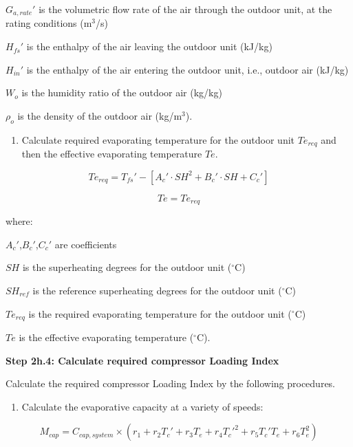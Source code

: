 \({G_{a,rate}}'\) is the volumetric flow rate of the air through the outdoor unit, at the rating conditions (m\(^{3}\)/s)

\({H_{fs}}'\) is the enthalpy of the air leaving the outdoor unit (kJ/kg)

\({H_{in}}'\) is the enthalpy of the air entering the outdoor unit, i.e., outdoor air (kJ/kg)

\(W_o\) is the humidity ratio of the outdoor air (kg/kg)

\(\rho_o\) is the density of the outdoor air (kg/m\(^{3}\)).

\begin{enumerate}
\def\labelenumi{(\arabic{enumi})}
\setcounter{enumi}{1}
\tightlist
\item
  Calculate required evaporating temperature for the outdoor unit \(Te_{req}\) and then the effective evaporating temperature \(Te\).
\end{enumerate}

\begin{equation}
Te_{req} = {T_{fs}}'-[{A_c}'\cdot SH^2+{B_c}'\cdot SH+{C_c}']
\end{equation}

\begin{equation}
Te = Te_{req}
\end{equation}

where:

\({A_c}'\),\({B_c}'\),\({C_c}'\) are coefficients

\(SH\) is the superheating degrees for the outdoor unit (\(^{\circ}\)C)

\(SH_{ref}\) is the reference superheating degrees for the outdoor unit (\(^{\circ}\)C)

\(Te_{req}\) is the required evaporating temperature for the outdoor unit (\(^{\circ}\)C)

\(Te\) is the effective evaporating temperature (\(^{\circ}\)C).

\textbf{Step 2h.4: Calculate required compressor Loading Index}

Calculate the required compressor Loading Index by the following procedures.

\begin{enumerate}
\def\labelenumi{\alph{enumi}.}
\tightlist
\item
  Calculate the evaporative capacity at a variety of speeds:
\end{enumerate}

\begin{equation}
  M_{cap} = C_{cap,system}\times(r_1+r_2{T_c}'+r_3T_e+r_4{T_c}'^2+r_5{T_c}'T_e+r_6T_e^2)
\end{equation}

